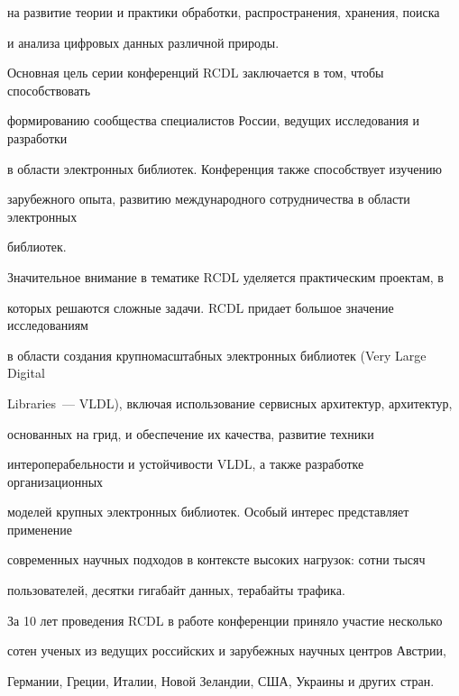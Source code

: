 \documentclass[10pt]{book}
\begin{document}
на развитие теории и практики обработки, распространения, хранения, поиска 


и анализа цифровых данных различной природы. 





Основная цель серии конференций RCDL заключается в том, чтобы способствовать 


формированию сообщества специалистов России, ведущих исследования и разработки 


в области электронных библиотек. Конференция также способствует изучению 


зарубежного опыта, развитию международного сотрудничества в области электронных 


библиотек. 





Значительное внимание в тематике RCDL уделяется практическим проектам, в 


которых решаются сложные задачи. RCDL придает большое значение исследованиям 


в области создания крупномасштабных электронных библиотек (Very Large Digital 


Libraries~--- VLDL), включая использование сервисных архитектур, архитектур, 


основанных на грид, и обеспечение их качества, развитие техники 


интероперабельности и устойчивости VLDL, а также разработке организационных 


моделей крупных электронных библиотек. Особый интерес представляет применение 


современных научных подходов в контексте высоких нагрузок: сотни тысяч 


пользователей, десятки гигабайт данных, терабайты трафика.














За 10 лет проведения RCDL в работе конференции приняло участие несколько


сотен ученых из ведущих российских и зарубежных научных центров Австрии,


Германии, Греции, Италии, Новой Зеландии, США, Украины и других стран.
\end{document}
